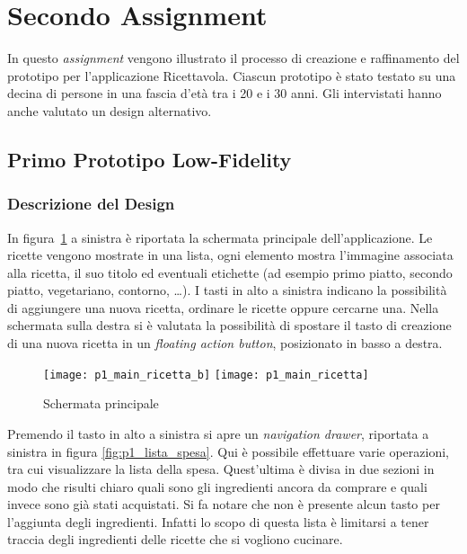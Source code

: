 
\section{Secondo Assignment}
In questo \textit{assignment} vengono illustrato il processo di creazione e raffinamento del prototipo per l'applicazione Ricettavola.
Ciascun prototipo è stato testato su una decina di persone in una fascia d'età tra i 20 e i 30 anni.
Gli intervistati hanno anche valutato un design alternativo.


\subsection{Primo Prototipo Low-Fidelity}

\subsubsection{Descrizione del Design}

In figura~\ref{fig:p1_main} a sinistra è riportata la schermata principale dell'applicazione.
Le ricette vengono mostrate in una lista, ogni elemento mostra l'immagine associata alla ricetta, il suo titolo ed eventuali etichette (ad esempio primo piatto, secondo piatto, vegetariano, contorno, \dots ).
I tasti in alto a sinistra indicano la possibilità di aggiungere una nuova ricetta, ordinare le ricette oppure cercarne una.
Nella schermata sulla destra si è valutata la possibilità di spostare il tasto di creazione di una nuova ricetta in un \textit{floating action button}, posizionato in basso a destra.

\begin{figure}[ht]
  \begin{center}
    \texttt{[image: p1\_main\_ricetta\_b]}
    \texttt{[image: p1\_main\_ricetta]}
    \caption{Schermata principale}
    \label{fig:p1_main}
  \end{center}
\end{figure}

\clearpage
Premendo il tasto in alto a sinistra si apre un \textit{navigation drawer}, riportata a sinistra in figura \ref{fig:p1_lista_spesa}.
Qui è possibile effettuare varie operazioni, tra cui visualizzare la lista della spesa.
Quest'ultima è divisa in due sezioni in modo che risulti chiaro quali sono gli ingredienti ancora da comprare e quali invece sono già stati acquistati.
Si fa notare che non è presente alcun tasto per l'aggiunta degli ingredienti.
Infatti lo scopo di questa lista è limitarsi a tener traccia degli ingredienti delle ricette che si vogliono cucinare.

